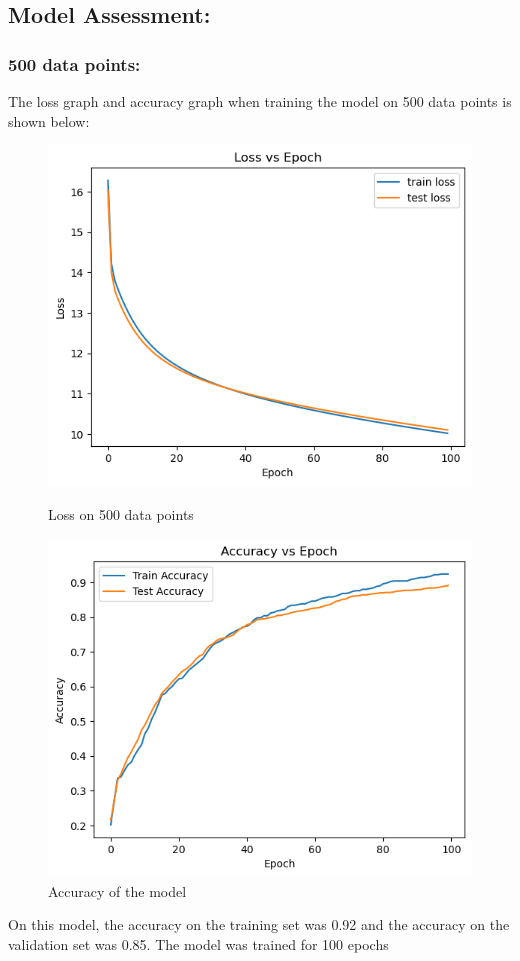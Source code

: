 \documentclass{article}
\begin{document}
\subsection*{Model Assessment:}
\subsubsection*{500 data points:}
The loss graph and accuracy graph when training the model on 500 data points is shown below:
\begin{figure}[h!]
    \centering
    \begin{minipage}{0.45\textwidth}
        \centering
        \includegraphics[width=1\textwidth]{loss_500.png} %
        \caption{Loss on 500 data points}
    \end{minipage}\hfill
    \begin{minipage}{0.45\textwidth}
        \centering
        \includegraphics[width=1\textwidth]{accuracy_500.png} %
        \caption{Accuracy of the model}
    \end{minipage}
\end{figure}
\newline On this model, the accuracy on the training set was 0.92 and the accuracy on the validation set was 0.85. The model was trained for 100 epochs
\end{document}
